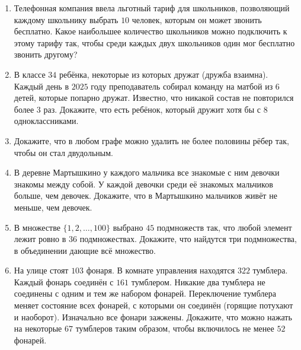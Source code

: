 \begin{enumerate}[label=\textbf{\arabic*.}, leftmargin=1.2cm]

    \item Телефонная компания ввела льготный тариф для школьников, позволяющий каждому школьнику выбрать $10$ человек, которым он может звонить бесплатно. Какое наибольшее количество школьников можно подключить к этому тарифу так, чтобы среди каждых двух школьников один мог бесплатно звонить другому?

    \item В классе $34$ ребёнка, некоторые из которых дружат (дружба взаимна). Каждый день в $2025$ году преподаватель собирал команду на матбой из $6$ детей, которые попарно дружат. Известно, что никакой состав не повторился более $3$ раз. Докажите, что есть ребёнок, который дружит хотя бы с $8$ одноклассниками.

    \item Докажите, что в любом графе можно удалить не более половины рёбер так, чтобы он стал двудольным.

    \item В деревне Мартышкино у каждого мальчика все знакомые с ним девочки знакомы между собой. У каждой девочки среди её знакомых мальчиков больше, чем девочек. Докажите, что в Мартышкино мальчиков живёт не меньше, чем девочек.

    \item В множестве $\{1,2,\ldots,100\}$ выбрано $45$ подмножеств так, что любой элемент лежит ровно в $36$ подмножествах. Докажите, что найдутся три подмножества, в объединении дающие всё множество.

    \item На улице стоят $103$ фонаря. В комнате управления находятся $322$ тумблера. Каждый фонарь соединён с $161$ тумблером. Никакие два тумблера не соединены с одним и тем же набором фонарей. Переключение тумблера меняет состояние всех фонарей, с которыми он соединён (горящие потухают и наоборот). Изначально все фонари зажжены. Докажите, что можно нажать на некоторые $67$ тумблеров таким образом, чтобы включилось не менее $52$ фонарей.

\end{enumerate}